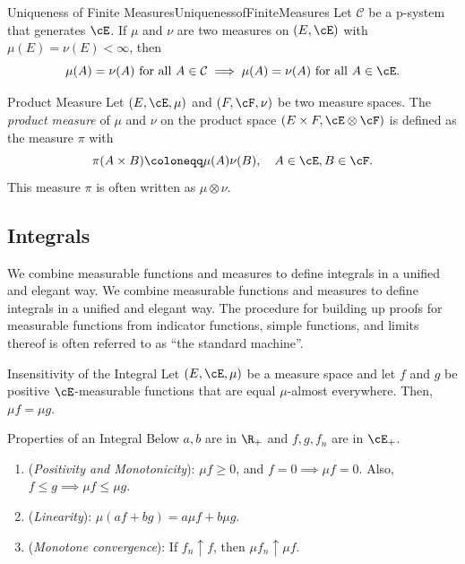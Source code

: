 \begin{thm}{Uniqueness of Finite Measures}{UniquenessofFiniteMeasures}
	Let \(\mathcal{C}\) be a p-system that generates \(\cE\). If \(\mu\) and \(\nu\) are two measures on \((E, \cE)\) with \(\mu(E) = \nu(E) < \infty\), then
	\begin{equation*}
		\mu(A) = \nu(A) \text{ for all } A \in \mathcal{C} \implies \mu(A) = \nu(A) \text{ for all } A \in \cE.
	\end{equation*}
\end{thm}

\begin{defn}{Product Measure}{}
	Let \((E, \cE, \mu)\) and \((F, \cF, \nu)\) be two measure spaces. The \textit{product measure} of \(\mu\) and \(\nu\) on the product space \((E \times F, \cE \otimes \cF)\) is defined as the measure \(\pi\) with
	\begin{equation}
		\pi(A \times B) \coloneqq \mu(A) \nu(B), \quad A \in \cE, B \in \cF.
		\label{eq:ProductMeasureDef}
	\end{equation}
	This measure \(\pi\) is often written as \(\mu \otimes \nu\).
\end{defn}

\subsection{Integrals}
We combine measurable functions and measures to define integrals in a unified and elegant way. We combine measurable functions and measures to define integrals
in a unified and elegant way. The procedure for building up proofs for measurable functions from indicator functions, simple functions, and limits thereof is often referred to as “the standard machine”.

\begin{prop}{Insensitivity of the Integral}{}
	Let \((E, \cE, \mu)\) be a measure space and let \(f\) and \(g\) be positive \(\cE\)-measurable functions that are equal \(\mu\)-almost everywhere. Then, \(\mu f = \mu g\).
\end{prop}

\begin{thm}{Properties of an Integral}{}
	Below \(a, b\) are in \(\R_+\) and \(f, g, f_n\) are in \(\cE_+\).
	\begin{enumerate}
		\item (\textit{Positivity and Monotonicity}): \(\mu f \ge 0\), and \(f = 0 \implies \mu f = 0\). Also, \(f \le g \implies \mu f \le \mu g\).
		\item (\textit{Linearity}): \(\mu(af + bg) = a \mu f + b \mu g\).
		\item (\textit{Monotone convergence}): If \(f_n \uparrow f\), then \(\mu f_n \uparrow \mu f\).
	\end{enumerate}
\end{thm}

